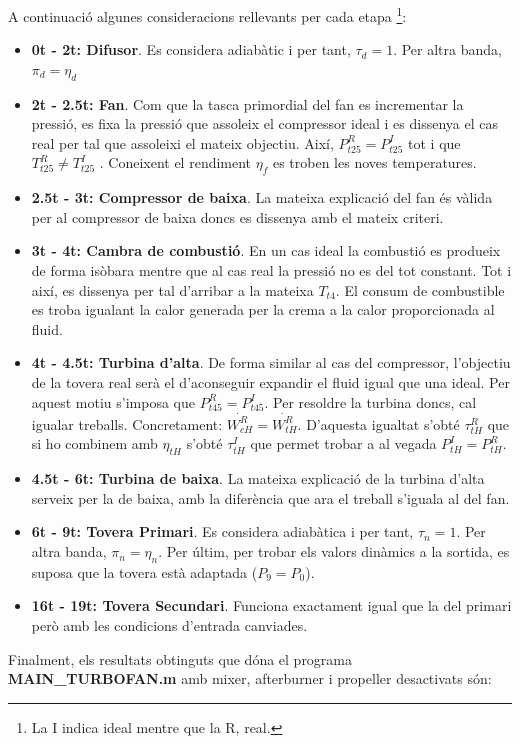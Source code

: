 A continuació algunes consideracions rellevants per cada etapa \footnote{La I indica ideal mentre que la R, real.}:
\begin{itemize}
\item \textbf{0t - 2t: Difusor}. Es considera adiabàtic i per tant, $\tau_d = 1$. Per altra banda, $\pi_d = \eta_d$
\item \textbf{2t - 2.5t: Fan}. Com que la tasca primordial del fan es incrementar la pressió, es fixa la pressió que assoleix el compressor ideal i es dissenya el cas real per tal que assoleixi el mateix objectiu. Així, $P_{t25}^R = P_{t25}^I$ tot i que $T_{t25}^R \neq T_{t25}^I$ . Coneixent el rendiment $\eta_f$ es troben les noves temperatures.
\item \textbf{2.5t - 3t: Compressor de baixa}. La mateixa explicació del fan és vàlida per al compressor de baixa doncs es dissenya amb el mateix criteri.
\item \textbf{3t - 4t: Cambra de combustió}. En un cas ideal la combustió es produeix de forma isòbara mentre que al cas real la pressió no es del tot constant. Tot i així, es dissenya per tal d'arribar a la mateixa $T_{t4}$. El consum de combustible es troba igualant la calor generada per la crema a la calor proporcionada al fluid.
\item \textbf{4t - 4.5t: Turbina d'alta}. De forma similar al cas del compressor, l'objectiu de la tovera real serà el d'aconseguir expandir el fluid igual que una ideal. Per aquest motiu s'imposa que $P_{t45}^R = P_{t45}^I$.  Per resoldre la turbina doncs, cal igualar treballs. Concretament: $\dot{W_{cH}^R} = \dot{W_{tH}^R} $. D'aquesta igualtat s'obté $\tau_{tH}^R$ que si ho combinem amb $\eta_{tH}$ s'obté $\tau_{tH}^I$ que permet trobar a al vegada $P_{tH}^{I} = P_{tH}^{R}$.
\item \textbf{4.5t - 6t: Turbina de baixa}. La mateixa explicació de la turbina d'alta serveix per la de baixa, amb la diferència que ara el treball s'iguala al del fan.
\item \textbf{6t - 9t: Tovera Primari}. Es considera adiabàtica i per tant, $\tau_n = 1$. Per altra banda, $\pi_n = \eta_n$. Per últim, per trobar els valors dinàmics a la sortida, es suposa que la tovera està adaptada ($P_9 = P_0$).
\item \textbf{16t - 19t: Tovera Secundari}. Funciona exactament igual que la del primari però amb les condicions d'entrada canviades.
\end{itemize}
Finalment, els resultats obtinguts que dóna el programa \textbf{MAIN\_TURBOFAN.m} amb mixer, afterburner i propeller desactivats són:
